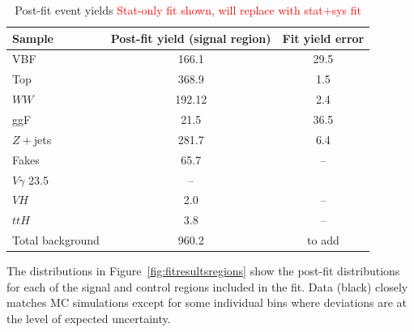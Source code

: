 \begin{table}[!h]
  \begin{center}
    \begin{tabular}{l|c|c|}
      Sample   & Post-fit yield (signal region) & Fit yield error \\
      \hline
      VBF   &   166.1 & 29.5 \\
      Top   &  368.9 & 1.5 \\
      $WW$ & 192.12 & 2.4 \\
      ggF &  21.5 & 36.5 \\
      $Z+$jets & 281.7 & 6.4 \\
      Fakes &  65.7 & -- \\
      $V\gamma$ 23.5 & -- \\
      $VH$ & 2.0 & -- \\
      $ttH$ & 3.8 & -- \\
      Total background & 960.2 &to add \\
      \hline
    \end{tabular}
    \caption{Post-fit event yields \textcolor{red}{Stat-only fit shown, will replace with stat+sys fit}}
    \label{tab:postfityields}
  \end{center}
\end{table}

The distributions in Figure~\ref{fig:fitresultsregions} show the post-fit distributions for each of the signal and control regions included in the fit. Data (black) closely matches MC simulations except for some individual bins where deviations are at the level of expected uncertainty. 

